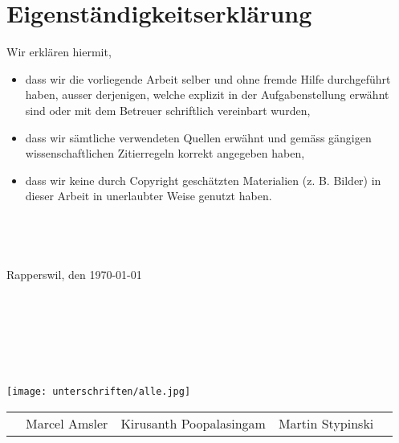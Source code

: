 \cleardoublepage
{}
{}
\chapter*{Eigenständigkeitserklärung}

Wir erklären hiermit,
\begin{itemize}
	\item{dass wir die vorliegende Arbeit selber und ohne fremde Hilfe durchgeführt haben, ausser
derjenigen, welche explizit in der Aufgabenstellung erwähnt sind oder mit dem Betreuer
schriftlich vereinbart wurden,}
	\item{dass wir sämtliche verwendeten Quellen erwähnt und gemäss gängigen wissenschaftlichen
Zitierregeln korrekt angegeben haben,}
	\item{dass wir keine durch Copyright geschätzten Materialien (z. B. Bilder) in dieser Arbeit in
unerlaubter Weise genutzt haben.}
\end{itemize}
\begin{verbatim}




\end{verbatim}
Rapperswil, den \today
\begin{verbatim}







\end{verbatim}
\centering
\texttt{[image: unterschriften/alle.jpg]}
\begin{tabular*}{\textwidth}{p{0cm}>{\centering\arraybackslash}m{4.8cm}>{\centering\arraybackslash}m{4.8cm}>{\centering\arraybackslash}m{4.8cm}p{0cm}}
	& Marcel Amsler & Kirusanth Poopalasingam & Martin Stypinski & \\
\end{tabular*}
